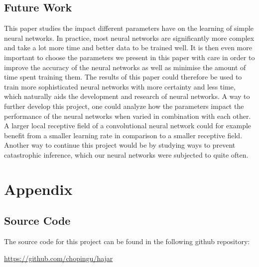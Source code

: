 \documentclass[titlepage]{article}
\begin{document}
\subsection{Future Work}

\vskip 0.2cm

This paper studies the impact different parameters have on the learning of simple neural networks. In practice, most neural networks are significantly more complex and take a lot more time and better data to be trained well. It is then even more important to choose the parameters we present in this paper with care in order to improve the accuracy of the neural networks as well as minimise the amount of time spent training them. The results of this paper could therefore be used to train more sophisticated neural networks with more certainty and less time, which naturally aids the development and research of neural networks. A way to further develop this project, one could analyze how the parameters impact the performance of the neural networks when varied in combination with each other. A larger local receptive field of a convolutional neural network could for example benefit from a smaller learning rate in comparison to a smaller receptive field. Another way to continue this project would be by studying ways to prevent catastrophic inference, which our neural networks were subjected to quite often. 

\newpage




\newpage

\appendix

\section{Appendix}
\subsection{Source Code}

\vskip 0.2cm

\centerline{The source code for this project can be found in the following github repository:}

\vskip 0.3cm

\centerline{\href{https://github.com/chopingu/hajar}{https://github.com/chopingu/hajar}}
\end{document}
